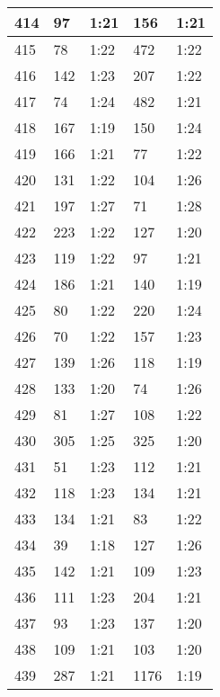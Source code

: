 \begin{center}
\begin{longtable}{|p{2cm}|l|l|l|l|}
414	&   97            &  1:21  &		156     	& 1:21 \\ \hline
415	&   78            &  1:22  &		472     	& 1:22 \\ \hline
416	&   142           &  1:23  &		207     	& 1:22 \\ \hline
417	&   74            &  1:24  &		482     	& 1:21 \\ \hline
418	&   167           &  1:19  &		150     	& 1:24 \\ \hline
419	&   166           &  1:21  &		77      	& 1:22 \\ \hline
420	&   131           &  1:22  &		104     	& 1:26 \\ \hline
421	&   197           &  1:27  &		71      	& 1:28 \\ \hline
422	&   223           &  1:22  &		127     	& 1:20 \\ \hline
423	&   119           &  1:22  &		97      	& 1:21 \\ \hline
424	&   186           &  1:21  &		140     	& 1:19 \\ \hline
425	&   80            &  1:22  &		220     	& 1:24 \\ \hline
426	&   70            &  1:22  &		157     	& 1:23 \\ \hline
427	&   139           &  1:26  &		118     	& 1:19 \\ \hline
428	&   133           &  1:20  &		74      	& 1:26 \\ \hline
429	&   81            &  1:27  &		108     	& 1:22 \\ \hline
430	&   305           &  1:25  &		325     	& 1:20 \\ \hline
431	&   51            &  1:23  &		112     	& 1:21 \\ \hline
432	&   118           &  1:23  &		134     	& 1:21 \\ \hline
433	&   134           &  1:21  &		83      	& 1:22 \\ \hline
434	&   39            &  1:18  &		127     	& 1:26 \\ \hline
435	&   142           &  1:21  &		109     	& 1:23 \\ \hline
436	&   111           &  1:23  &		204     	& 1:21 \\ \hline
437	&   93            &  1:23  &		137     	& 1:20 \\ \hline
438	&   109           &  1:21  &		103     	& 1:20 \\ \hline
439	&   287           &  1:21  &		1176    	& 1:19 \\ \hline

\end{longtable}
\end{center}
